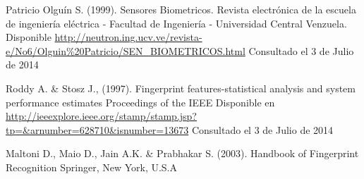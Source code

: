 \begin{spacing}{1.0}
\begin{thebibliography}{99}
Patricio Olguín S. (1999).
\newblock Sensores Biometricos.
\newblock Revista electrónica de la escuela de ingeniería eléctrica - Facultad de Ingeniería - Universidad Central Venzuela.
\newblock Disponible \url{http://neutron.ing.ucv.ve/revista-e/No6/Olguin\%20Patricio/SEN_BIOMETRICOS.html}
\newblock Consultado el 3 de Julio de 2014


Roddy A. \& Stosz J., (1997).
\newblock Fingerprint features-statistical analysis and system performance estimates
\newblock Proceedings of the IEEE
\newblock Disponible en \url{http://ieeexplore.ieee.org/stamp/stamp.jsp?tp=&arnumber=628710&isnumber=13673}
\newblock Consultado el 3 de Julio de 2014

Maltoni D., Maio D., Jain A.K. \& Prabhakar S. (2003).
\newblock Handbook of Fingerprint Recognition
\newblock Springer, New York, U.S.A





\end{thebibliography}	
\end{spacing}

